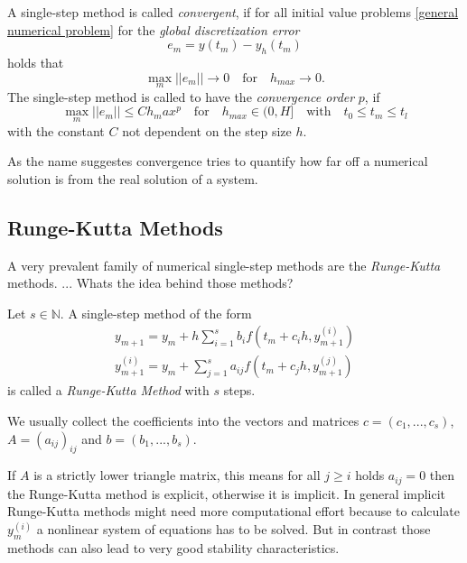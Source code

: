 	\begin{definition}
		A single-step method is called \emph{convergent}, if for all initial value problems \ref{general numerical problem} for the \emph{global discretization error}
		\begin{displaymath}
			e_m = y(t_m)-y_h(t_m)
		\end{displaymath}
		holds that
		\begin{displaymath}
			\max\limits_{m}||e_m|| \to 0 \quad \text{for} \quad h_{max} \to 0.
		\end{displaymath}
		The single-step method is called to have the \emph{convergence order} $p$, if
		\begin{displaymath}
			\max\limits_{m} ||e_m|| \leq C h_max^p \quad \text{for} \quad h_{max} \in \mathopen{(} 0,H \mathclose{]} \quad \text{with} \quad t_0 \leq t_m \leq t_l
		\end{displaymath}
		with the constant $C$ not dependent on the step size $h$.
	\end{definition}

	As the name suggestes convergence tries to quantify how far off a numerical solution is from the real solution of a system.

	\subsection{Runge-Kutta Methods}
		A very prevalent family of numerical single-step methods are the \emph{Runge-Kutta} methods. ... Whats the idea behind those methods?
		
		\begin{definition}
			Let $s \in \mathbb{N}$. A single-step method of the form
			\begin{align}
				y_{m+1} = y_m + h \sum_{i=1}^{s} b_i f(t_m + c_ih, y_{m+1}^{(i)}) \\ 
				y_{m+1}^{(i)} = y_m +  \sum_{j=1}^{s} a_{ij} f(t_m + c_jh, y_{m+1}^{(j)})
			\end{align}
			is called a \emph{Runge-Kutta Method} with $s$ steps.
		\end{definition}
		
		We usually collect the coefficients into the vectors and matrices $c=(c_1, ...,c_s)$, $A = (a_{ij})_{ij}$ and $b=(b_1, ..., b_s)$.
		
		If $A$ is a strictly lower triangle matrix, this means for all $j \geq i$ holds $a_{ij} = 0$ then the Runge-Kutta method is explicit, otherwise it is implicit. In general implicit Runge-Kutta methods might need more computational effort because to calculate $y_m^{(i)}$ a nonlinear system of equations has to be solved. But in contrast those methods can also lead to very good stability characteristics.
		
